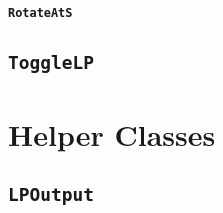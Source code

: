 \paragraph{\texttt{RotateAtS}}

\subsection{\texttt{ToggleLP}}

\section{Helper Classes}

\subsection{\texttt{LPOutput}}

